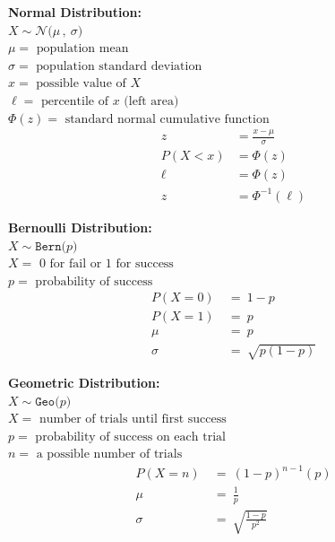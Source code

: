 \documentclass[12pt,letterpaper,addpoints]{exam}
\begin{document}
\newcommand{\N}[2]{\mathcal{N}\big(#1\,,~#2\big)}
\newcommand{\Bern}[1]{\texttt{Bern}\big(#1\big)}
\newcommand{\Geo}[1]{\texttt{Geo}\big(#1\big)}
\newcommand{\B}[2]{\mathcal{B}\big(#1\,,~#2\big)}
\newcommand{\Sampp}[2]{\texttt{Samp}_{\hat{p}}\big(#1,~#2\big)}

\newpage

\begin{multicols}{2}


{\bf Normal Distribution:}\\
$X \sim \N{\mu}{\sigma}$\\
$\mu = \text{ population mean} $\\
$\sigma = \text{ population standard deviation} $\\
$x = \text{ possible value of }X $\\
$\ell = \text{ percentile of } x \text{ (left area)}$\\
$\Phi(z) = \text{ standard normal cumulative function}$
\begin{align*}
z &= \frac{x-\mu}{\sigma}\\
P(X < x) &= \Phi(z)\\
\ell &= \Phi(z)\\
z &= \Phi^{-1}(\ell)
\end{align*}

{\bf Bernoulli Distribution:}\\
$X \sim \Bern{p} $\\
$X = \text{ 0 for fail or 1 for success}$\\
$p = \text{ probability of success}$
\begin{align*}
P(X=0) ~&=~ 1-p \\
P(X=1) ~&=~ p \\
\mu ~&=~ p\\
\sigma ~&=~ \sqrt{p(1-p)}
\end{align*}

{\bf Geometric Distribution:}\\
$X \sim \Geo{p}$ \\
$X = \text{ number of trials until first success}$\\
$p = \text{ probability of success on each trial}$\\
$n = \text{ a possible number of trials}$
\begin{align*}
P(X=n) ~&=~ (1-p)^{n-1}(p)\\
\mu ~&=~ \frac{1}{p}\\
\sigma ~&=~ \sqrt{\frac{1-p}{p^2}} 
\end{align*}


\end{multicols}
\end{document}
